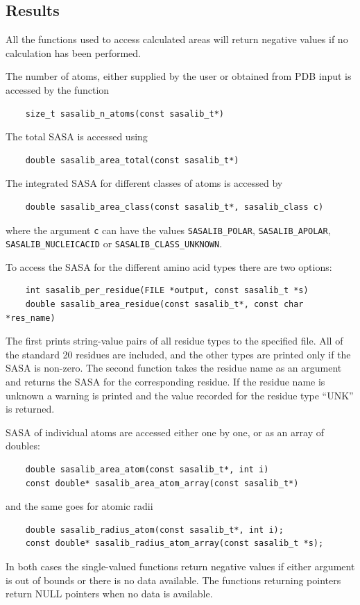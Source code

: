 \documentclass[a4paper,11pt]{article}
\begin{document}
\subsection{Results}

All the functions used to access calculated areas will return negative
values if no calculation has been performed.

The number of atoms, either supplied by the user or obtained from PDB input
is accessed by the function
\begin{verbatim}
    size_t sasalib_n_atoms(const sasalib_t*)
\end{verbatim}
The total SASA is accessed using
\begin{verbatim}
    double sasalib_area_total(const sasalib_t*)
\end{verbatim}
The integrated SASA for different classes of atoms is accessed by
\begin{verbatim}
    double sasalib_area_class(const sasalib_t*, sasalib_class c)
\end{verbatim}
where the argument \verb|c| can have the values \verb|SASALIB_POLAR|, 
\verb|SASALIB_APOLAR|, \verb|SASALIB_NUCLEICACID| or 
\verb|SASALIB_CLASS_UNKNOWN|.

To access the SASA for the different amino acid types there are two
options:
\begin{verbatim}
    int sasalib_per_residue(FILE *output, const sasalib_t *s)
    double sasalib_area_residue(const sasalib_t*, const char *res_name)
\end{verbatim}
The first prints string-value pairs of all residue types to the
specified file. All of the standard 20 residues are included, and the
other types are printed only if the SASA is non-zero.  The second
function takes the residue name as an argument and returns the SASA for
the corresponding residue. If the residue name is unknown a warning is
printed and the value recorded for the residue type ``UNK'' is
returned.

SASA of individual atoms are accessed either one by one, or
as an array of doubles:
\begin{verbatim}
    double sasalib_area_atom(const sasalib_t*, int i)
    const double* sasalib_area_atom_array(const sasalib_t*)
\end{verbatim}
and the same goes for atomic radii
\begin{verbatim}
    double sasalib_radius_atom(const sasalib_t*, int i);
    const double* sasalib_radius_atom_array(const sasalib_t *s);
\end{verbatim}
In both cases the single-valued functions return negative values if
either argument is out of bounds or there is no data available. The
functions returning pointers return NULL pointers when no data is
available.
\end{document}
